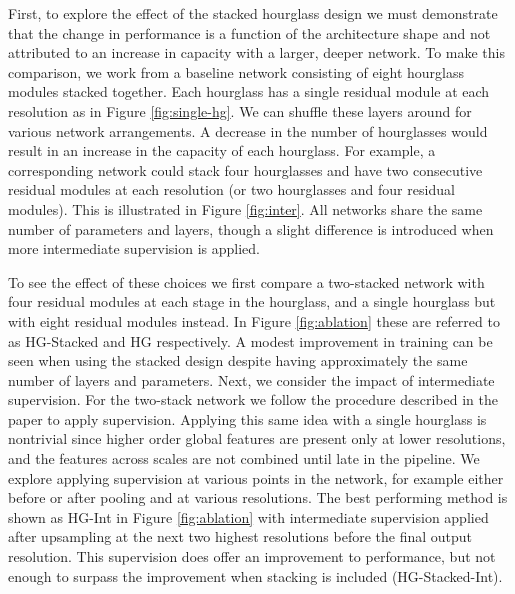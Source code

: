 \documentclass[runningheads]{llncs}
\begin{document}
First, to explore the effect of the stacked hourglass design we must
demonstrate that the change in performance is a function of the
architecture shape and not attributed to an increase in capacity with
a larger, deeper network. To make this comparison, we work from a
baseline network consisting of eight hourglass modules stacked
together. Each hourglass has a single residual module at each
resolution as in Figure \ref{fig:single-hg}. We can shuffle these
layers around for various network arrangements. A decrease in the
number of hourglasses would result in an increase in the capacity of
each hourglass. For example, a corresponding network could stack four
hourglasses and have two consecutive residual modules at each
resolution (or two hourglasses and four residual modules). This is
illustrated in Figure \ref{fig:inter}. All networks share the same
number of parameters and layers, though a slight difference is
introduced when more intermediate supervision is applied.

To see the effect of these choices we first compare a two-stacked
network with four residual modules at each stage in the hourglass, and
a single hourglass but with eight residual modules instead. In Figure
\ref{fig:ablation} these are referred to as HG-Stacked and HG
respectively. A modest improvement in training can be seen when using
the stacked design despite having approximately the same number of
layers and parameters. Next, we consider the impact of intermediate
supervision. For the two-stack network we follow the procedure
described in the paper to apply supervision. Applying this same idea
with a single hourglass is nontrivial since higher order global
features are present only at lower resolutions, and the features
across scales are not combined until late in the pipeline. We explore
applying supervision at various points in the network, for example
either before or after pooling and at various resolutions. The best
performing method is shown as HG-Int in Figure \ref{fig:ablation} with
intermediate supervision applied after upsampling at the next two
highest resolutions before the final output resolution. This
supervision does offer an improvement to performance, but not enough
to surpass the improvement when stacking is included (HG-Stacked-Int).
\end{document}
